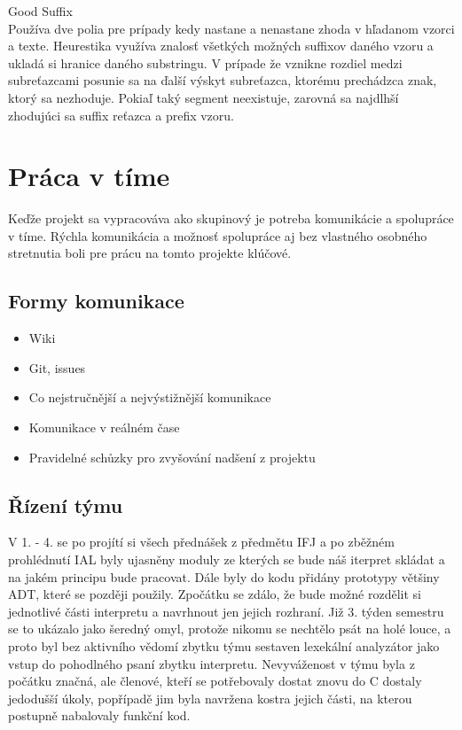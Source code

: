 \documentclass[a4paper]{article}
\begin{document}
Good Suffix\\
Používa dve polia pre prípady kedy nastane a nenastane zhoda v hľadanom vzorci a texte. Heurestika využíva znalosť všetkých možných suffixov daného vzoru a ukladá si hranice daného substringu. V prípade že vznikne rozdiel medzi subreťazcami posunie sa na ďalší výskyt subreťazca, ktorému prechádzca znak, ktorý sa nezhoduje. Pokiaľ taký segment neexistuje, zarovná sa najdlhší zhodujúci sa suffix reťazca a prefix vzoru.

\section{Práca v tíme}
Keďže projekt sa vypracováva ako skupinový je potreba komunikácie a spolupráce v tíme. Rýchla komunikácia a možnosť spolupráce aj bez vlastného osobného stretnutia boli pre prácu na tomto projekte klúčové.

\subsection{Formy komunikace}
\begin{itemize}
	\item Wiki
	\item Git, issues
	\item Co nejstručnější a nejvýstižnější komunikace
	\item Komunikace v reálném čase
	\item Pravidelné schůzky pro zvyšování nadšení z projektu	
\end{itemize}

\subsection{Řízení týmu}
V 1. - 4. se po projítí si všech přednášek z předmětu IFJ a po zběžném prohlédnutí IAL byly ujasněny moduly ze kterých se bude náš iterpret skládat a na jakém principu bude pracovat. Dále byly do kodu přidány prototypy většiny ADT, které se později použily.
Zpočátku se zdálo, že bude možné rozdělit si jednotlivé části interpretu a navrhnout jen jejich rozhraní. Již 3. týden semestru se to ukázalo jako šeredný omyl, protože nikomu se nechtělo psát na holé louce, a proto byl bez aktivního vědomí zbytku týmu sestaven lexekální analyzátor jako vstup do pohodlného psaní zbytku interpretu. Nevyváženost v týmu byla z počátku značná, ale členové, kteří se potřebovaly dostat znovu do C dostaly jedodušší úkoly, popřípadě jim byla navržena kostra jejich části, na kterou postupně nabalovaly funkční kod.
\end{document}
